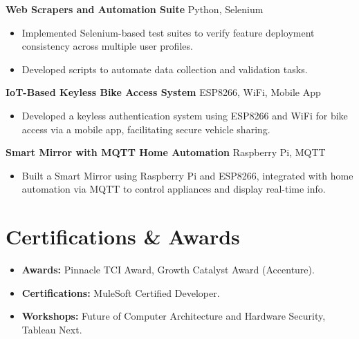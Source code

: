 \documentclass[letterpaper,10pt]{article}
\begin{document}
\textbf{Web Scrapers and Automation Suite} \hfill Python, Selenium
\begin{itemize}
    \item Implemented Selenium-based test suites to verify feature deployment consistency across multiple user profiles.
    \item Developed scripts to automate data collection and validation tasks.
\end{itemize}

\textbf{IoT-Based Keyless Bike Access System} \hfill ESP8266, WiFi, Mobile App
\begin{itemize}
    \item Developed a keyless authentication system using ESP8266 and WiFi for bike access via a mobile app, facilitating secure vehicle sharing.
\end{itemize}

\textbf{Smart Mirror with MQTT Home Automation} \hfill Raspberry Pi, MQTT
\begin{itemize}
    \item Built a Smart Mirror using Raspberry Pi and ESP8266, integrated with home automation via MQTT to control appliances and display real-time info.
\end{itemize}

\section*{Certifications \& Awards}
\begin{itemize} \itemsep -2pt
    \item \textbf{Awards:} Pinnacle TCI Award, Growth Catalyst Award (Accenture).
    \item \textbf{Certifications:} MuleSoft Certified Developer.
    \item \textbf{Workshops:} Future of Computer Architecture and Hardware Security, Tableau Next.
\end{itemize}
\end{document}
